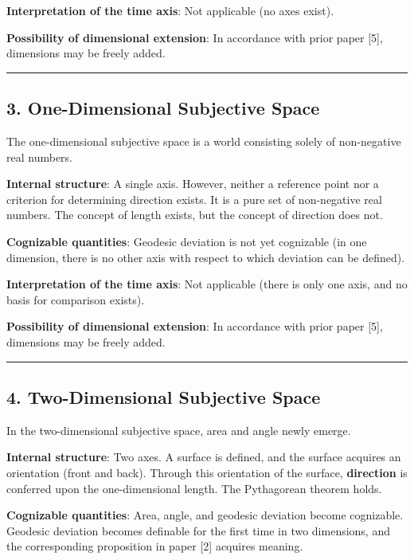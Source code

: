 \documentclass[a4paper,11pt]{article}
\theoremstyle{definition}
\begin{document}
\textbf{Interpretation of the time axis}: Not applicable (no axes exist).

\textbf{Possibility of dimensional extension}: In accordance with prior paper {[}5{]}, dimensions may be freely added.

\begin{center}\rule{0.5\linewidth}{0.5pt}\end{center}

\subsection{3. One-Dimensional Subjective Space}\label{one-dimensional-subjective-space}

The one-dimensional subjective space is a world consisting solely of non-negative real numbers.

\textbf{Internal structure}: A single axis. However, neither a reference point nor a criterion for determining direction exists. It is a pure set of non-negative real numbers. The concept of length exists, but the concept of direction does not.

\textbf{Cognizable quantities}: Geodesic deviation is not yet cognizable (in one dimension, there is no other axis with respect to which deviation can be defined).

\textbf{Interpretation of the time axis}: Not applicable (there is only one axis, and no basis for comparison exists).

\textbf{Possibility of dimensional extension}: In accordance with prior paper {[}5{]}, dimensions may be freely added.

\begin{center}\rule{0.5\linewidth}{0.5pt}\end{center}

\subsection{4. Two-Dimensional Subjective Space}\label{two-dimensional-subjective-space}

In the two-dimensional subjective space, area and angle newly emerge.

\textbf{Internal structure}: Two axes. A surface is defined, and the surface acquires an orientation (front and back). Through this orientation of the surface, \textbf{direction} is conferred upon the one-dimensional length. The Pythagorean theorem holds.

\textbf{Cognizable quantities}: Area, angle, and geodesic deviation become cognizable. Geodesic deviation becomes definable for the first time in two dimensions, and the corresponding proposition in paper {[}2{]} acquires meaning.
\end{document}
